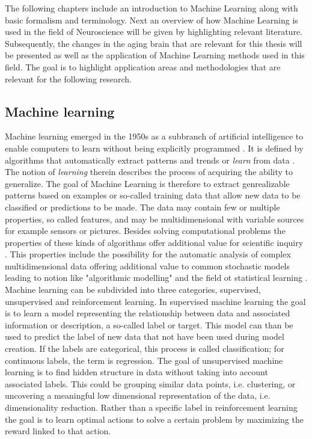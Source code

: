 The following chapters include an introduction to Machine Learning along with basic formalism and terminology. Next an overview of how Machine Learning is used in the field of Neuroscience will be given by highlighting relevant literature. Subsequently, the changes in the aging brain that are relevant for this thesis will be presented as well as the application of Machine Learning methods used in this field. The goal is to highlight application areas and methodologies that are relevant for the following research.  

\subsection{Machine learning}
\label{subsec:ML}
Machine learning emerged in the 1950s as a subbranch of artificial intelligence to enable computers to learn without being explicitly programmed \cite{Samual1959}. It is defined by algorithms that automatically extract patterns and trends or \textit{learn} from data \cite{Hastie2009}. The notion of \textit{learning} therein describes the process of acquiring the ability to generalize. The goal of Machine Learning is therefore to extract genrealizable patterns based on examples or so-called training data that allow new data to be classified or predictions to be made. The data may contain few or multiple properties, so called features, and may be multidimensional with variable sources for example sensors or pictures. Besides solving computational problems the properties of these kinds of algorithms offer additional value for scientific inquiry \cite{Breiman2001}. This properties include the possibility for the automatic analysis of complex multidimensional data \cite{Brunton2019} offering additional value to common stochastic models leading to notion like "algorithmic modelling" \cite{Breiman2001} and the field ot statistical learning \cite{Hastie2009}. 
Machine learning can be subdivided into three categories, supervised, unsupervised and reinforcement learning. In supervised machine learning the goal is to learn a model representing the relationship between data and associated information or description, a so-called label or target. This model can than be used to predict the label of new data that not have been used during model creation. If the labels are categorical, this process is called classification; for continuous labels, the term is regression. The goal of unsupervised machine learning is to find hidden structure in data without taking into account associated labels. This could be grouping similar data points, i.e. clustering, or uncovering a meaningful low dimensional representation of the data, i.e. dimensionality reduction. Rather than a specific label in reinforcement learning the goal is to learn optimal actions to solve a certain problem by maximizing the reward linked to that action.

